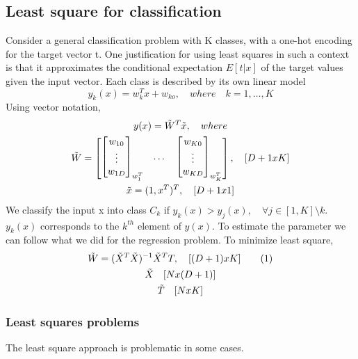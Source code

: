 \documentclass[../main.tex]{subfiles}
\begin{document}
\subsection{Least square for classification}
Consider a general classification problem with K classes, with a one-hot encoding for the target vector t. One justification for using least squares in such a context is that it approximates the conditional expectation $E[t|x]$ of the target values given the input vector.
Each class is described by its own linear model
\begin{equation}
    y_k(x) = w_k^Tx + w_{ko},\quad where \quad k=1,\dots,K
\end{equation}
Using vector notation,
\begin{gather*}
    y(x) = \Tilde{W}^T \Tilde{x}, \quad where \\
    \Tilde{W}=
    \begin{bmatrix}
        \begin{bmatrix}
            w_{10} \\ \vdots \\ w_{1D}
        \end{bmatrix}_{w_1^T}
         & \dots &
        \begin{bmatrix}
            w_{K0} \\ \vdots \\ w_{KD}
        \end{bmatrix}_{w_K^T}
    \end{bmatrix},\quad [D+1 x K] \\
    \Tilde{x}=(1, x^T)^T, \quad [D+1 x 1]
\end{gather*}
We classify the input x into class $C_k$ if $y_k(x)>y_j(x), \quad \forall j \in [1, K] \setminus k$. $y_k(x)$ corresponds to the $k^{th}$ element of $y(x)$.
To estimate the parameter we can follow what we did for the regression problem. To minimize least square,
\begin{gather*}
    \Tilde{W} = (\Tilde{X}^T \Tilde{X})^{-1} \Tilde{X}^T T, \quad [(D+1) x K] \numberthis \\
    \Tilde{X} \quad [N x (D+1)] \\
    \Tilde{T} \quad [N x K]
\end{gather*}
\subsubsection{Least squares problems}
The least square approach is problematic in some cases.
\end{document}
